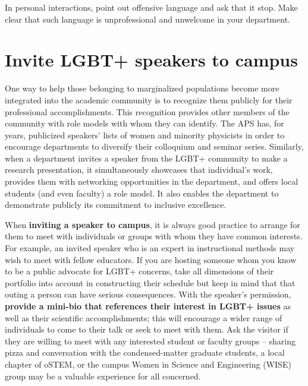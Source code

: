 In personal interactions, point out offensive language and ask that it stop.  Make clear that such language is unprofessional and unwelcome in your department.


\section {Invite LGBT+ speakers to campus}
\label{lgbt-speakers}
One way to help those belonging to marginalized populations become more integrated into the academic community is to recognize them publicly for their professional accomplishments. This recognition provides other members of the community with role models with whom they can identify. The APS has, for years, publicized speakers' lists of women and minority physicists in order to encourage departments to diversify their colloquium and seminar series.  Similarly, when a department invites a speaker from the LGBT+ community to make a research presentation, it simultaneously showcases that individual's work, provides them with networking opportunities in the department, and offers local students (and even faculty) a role model. It also enables the department to demonstrate publicly its commitment to inclusive excellence.

When \textbf{inviting a speaker to campus}, it is always good practice to arrange for them to meet with individuals or groups with whom they have common interests. For example, an invited speaker who is an expert in instructional methods may wish to meet with fellow educators. If you are hosting someone whom you know to be a public advocate for LGBT+ concerns, take all dimensions of their portfolio into account in constructing their schedule but keep in mind that that outing a person can have serious consequences. With the speaker's permission, \textbf{provide a mini-bio that references their interest in LGBT+ issues} as well as their scientific accomplishments; this will encourage a wider range of individuals to come to their talk or seek to meet with them. Ask the visitor if they are willing to meet with any interested student or faculty groups -- sharing pizza and conversation with the condensed-matter graduate students, a local chapter of oSTEM, or the campus Women in Science and Engineering (WISE) group may be a valuable experience for all concerned.

